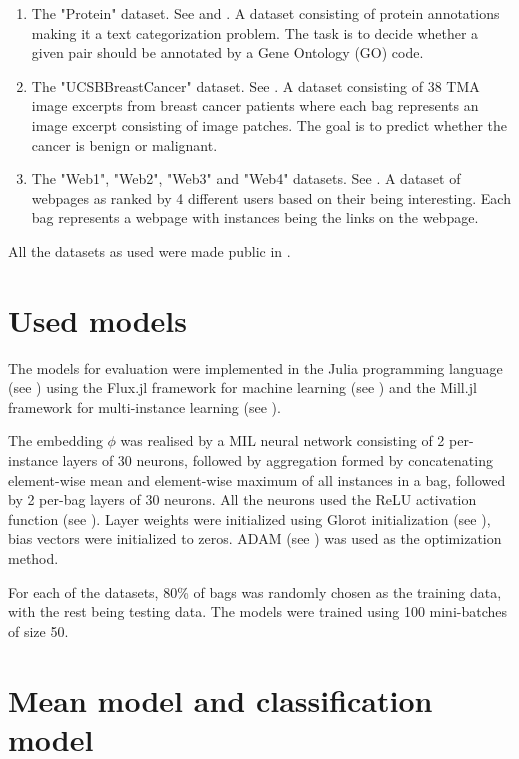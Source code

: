 \begin{enumerate}
  \item The "Protein" dataset. See \cite{ray_learning_2005} and \cite{ray_supervised_2005}. A dataset consisting of protein annotations making it a text categorization problem. The task is to decide whether a given pair should be annotated by a Gene Ontology (GO) code.
  \item The "UCSBBreastCancer" dataset. See \cite{kandemir_empowering_2014}. A dataset consisting of 38 TMA image excerpts from breast cancer patients where each bag represents an image excerpt consisting of image patches. The goal is to predict whether the cancer is benign or malignant.
  \item The "Web1", "Web2", "Web3" and "Web4" datasets. See \cite{zhou_multi-instance_2005}. A dataset of webpages as ranked by 4 different users based on their being interesting. Each bag represents a webpage with instances being the links on the webpage.
\end{enumerate}

All the datasets as used were made public in \cite{dedic_mildatasetsjl_2019}.

\section{Used models}

The models for evaluation were implemented in the Julia programming language (see \cite{bezanson_julia:_2017}) using the Flux.jl framework for machine learning (see \cite{innes_flux:_2018}) and the Mill.jl framework for multi-instance learning (see \cite{pevny_milljl_2019}).

The embedding \( \phi \) was realised by a MIL neural network consisting of 2 per-instance layers of 30 neurons, followed by aggregation formed by concatenating element-wise mean and element-wise maximum of all instances in a bag, followed by 2 per-bag layers of 30 neurons. All the neurons used the ReLU activation function (see \cite{hahnloser_digital_2000}). Layer weights were initialized using Glorot initialization (see \cite{glorot_understanding_2010}), bias vectors were initialized to zeros. ADAM (see \cite{kingma_adam:_2014}) was used as the optimization method.

For each of the datasets, 80\% of bags was randomly chosen as the training data, with the rest being testing data. The models were trained using 100 mini-batches of size 50.

\section{Mean model and classification model}\label{sec:baseline-models}

